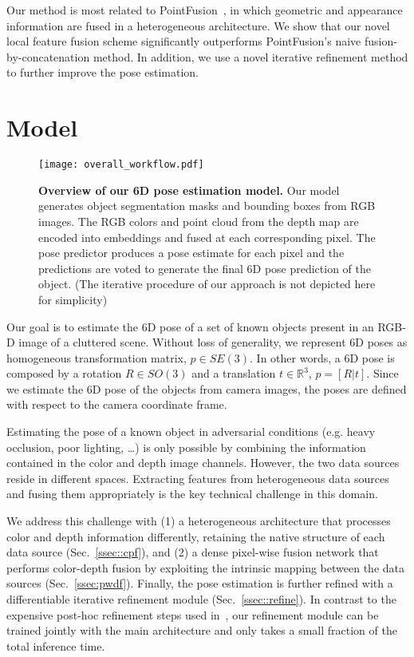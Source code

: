 \documentclass[10pt,twocolumn,letterpaper]{article}
\begin{document}
Our method is most related to PointFusion~\cite{xu2017pointfusion}, in which geometric and appearance information are fused in a heterogeneous architecture. We show that our novel local feature fusion scheme significantly outperforms PointFusion's naive fusion-by-concatenation method. In addition, we use a novel iterative refinement method to further improve the pose estimation.

\section{Model}
\begin{figure*}[ht]
	\centering
	\texttt{[image: overall\_workflow.pdf]}
	\caption{\textbf{Overview of our 6D pose estimation model.} Our model generates object segmentation masks and bounding boxes from RGB images. The RGB colors and point cloud from the depth map are encoded into embeddings and fused at each corresponding pixel. The pose predictor produces a pose estimate for each pixel and the predictions are voted to generate the final 6D pose prediction of the object. (The iterative procedure of our approach is not depicted here for simplicity)}
	\label{fig:overall}
\end{figure*}

Our goal is to estimate the 6D pose of a set of known objects present in an RGB-D image of a cluttered scene.
Without loss of generality, we represent 6D poses as homogeneous transformation matrix, $p \in SE(3)$. 
In other words, a 6D pose is composed by a rotation $R \in SO(3)$ and a translation $t \in \mathbb{R}^3$, $p=[R|t]$.
Since we estimate the 6D pose of the objects from camera images, the poses are defined with respect to the camera coordinate frame.

Estimating the pose of a known object in adversarial conditions (e.g. heavy occlusion, poor lighting, \ldots) is only possible by combining the information contained in the color and depth image channels. 
However, the two data sources reside in different spaces. Extracting features from heterogeneous data sources and fusing them appropriately is the key technical challenge in this domain. 

We address this challenge with (1) a heterogeneous architecture that processes color and depth information differently, retaining the native structure of each data source (Sec.~\ref{ssec::cpf}), and (2) a dense pixel-wise fusion network that performs color-depth fusion by exploiting the intrinsic mapping between the data sources (Sec.~\ref{ssec:pwdf}). Finally, the pose estimation is further refined with a differentiable iterative refinement module (Sec.~\ref{ssec::refine}). In contrast to the expensive post-hoc refinement steps used in~\cite{xiang2017posecnn,li2018unified}, our refinement module can be trained jointly with the main architecture and only takes a small fraction of the total inference time.
\end{document}
